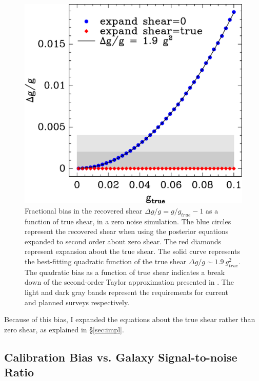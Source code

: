 \documentclass[12pt,preprint]{aastex}
\begin{document}
\begin{figure}[t] \centering
 \centering 
 \includegraphics[scale=0.6]{figures/fracerr-vs-shear.eps}

 \caption{Fractional bias in the recovered shear $\Delta g/g = g/g_{true}-1$
     as a function of true shear,
     in a zero noise simulation.  The blue circles represent the recovered
     shear when using the posterior equations expanded to second order about
     zero shear.  The red diamonds represent expansion about the true shear.
     The solid curve represents the best-fitting quadratic function of the true
     shear $\Delta g/g \sim 1.9~g^2_{true}$.  The quadratic bias as a function of
     true shear indicates a break down of the second-order Taylor approximation
 presented in \cite{ba14}. The light and dark gray bands represent the
 requirements for current and planned surveys respectively.
 \label{fig:nonoise}}

\end{figure}

Because of this bias, I expanded the equations about the true shear rather than
zero shear, as explained in \S \ref{sec:impl}.

\subsection{Calibration Bias vs. Galaxy Signal-to-noise Ratio} \label{sec:snbias}
\end{document}
